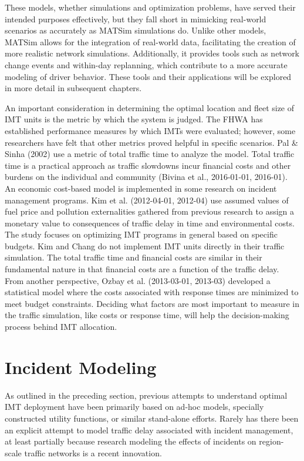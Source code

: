 \documentclass[fancy, oneside, mastersfancy, ms]{byuthesis}
\begin{document}
These models, whether simulations and optimization problems, have served
their intended purposes effectively, but they fall short in mimicking
real-world scenarios as accurately as MATSim simulations do. Unlike
other models, MATSim allows for the integration of real-world data,
facilitating the creation of more realistic network simulations.
Additionally, it provides tools such as network change events and
within-day replanning, which contribute to a more accurate modeling of
driver behavior. These tools and their applications will be explored in
more detail in subsequent chapters.

An important consideration in determining the optimal location and fleet
size of IMT units is the metric by which the system is judged. The FHWA
has established performance measures by which IMTs were evaluated;
however, some researchers have felt that other metrics proved helpful in
specific scenarios. Pal \& Sinha (2002) use a metric of total traffic
time to analyze the model. Total traffic time is a practical approach as
traffic slowdowns incur financial costs and other burdens on the
individual and community (Bivina et al., 2016-01-01, 2016-01). An
economic cost-based model is implemented in some research on incident
management programs. Kim et al. (2012-04-01, 2012-04) use assumed values
of fuel price and pollution externalities gathered from previous
research to assign a monetary value to consequences of traffic delay in
time and environmental costs. The study focuses on optimizing IMT
programs in general based on specific budgets. Kim and Chang do not
implement IMT units directly in their traffic simulation. The total
traffic time and financial costs are similar in their fundamental nature
in that financial costs are a function of the traffic delay. From
another perspective, Ozbay et al. (2013-03-01, 2013-03) developed a
statistical model where the costs associated with response times are
minimized to meet budget constraints. Deciding what factors are most
important to measure in the traffic simulation, like costs or response
time, will help the decision-making process behind IMT allocation.

\hypertarget{incident-modeling}{%
\section{Incident Modeling}\label{incident-modeling}}

As outlined in the preceding section, previous attempts to understand
optimal IMT deployment have been primarily based on ad-hoc models,
specially constructed utility functions, or similar stand-alone efforts.
Rarely has there been an explicit attempt to model traffic delay
associated with incident management, at least partially because research
modeling the effects of incidents on region-scale traffic networks is a
recent innovation.
\end{document}
